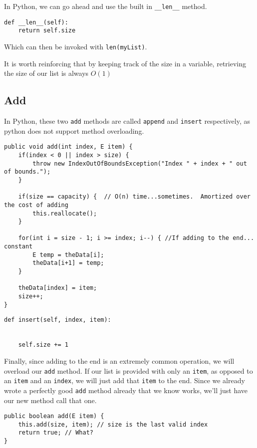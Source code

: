 In Python, we can go ahead and use the built in \texttt{\_\_len\_\_} method.

\begin{verbatim}
def __len__(self):
	return self.size
\end{verbatim}

Which can then be invoked with \texttt{len(myList)}.


It is worth reinforcing that by keeping track of the size in a variable, retrieving the size of our list is always $O(1)$

\subsection{Add}



In Python, these two \texttt{add} methods are called \texttt{append} and \texttt{insert} respectively, as python does not support method overloading.

\begin{verbatim}
public void add(int index, E item) {
	if(index < 0 || index > size) {
		throw new IndexOutOfBoundsException("Index " + index + " out of bounds.");
	}
	
	if(size == capacity) {  // O(n) time...sometimes.  Amortized over the cost of adding
		this.reallocate();
	}
	
	for(int i = size - 1; i >= index; i--) { //If adding to the end... constant
		E temp = theData[i];
		theData[i+1] = temp;
	}
	
	theData[index] = item;
	size++;
}
\end{verbatim}


\begin{verbatim}
def insert(self, index, item):
	
	
	self.size += 1

\end{verbatim}





Finally, since adding to the end is an extremely common operation, we will overload our \texttt{add} method.
If our list is provided with only an \texttt{item}, as opposed to an \texttt{item} and an \texttt{index}, we will just add that \texttt{item} to the end.
Since we already wrote a perfectly good \texttt{add} method already that we know works, we'll just have our new method call that one.
\begin{verbatim}
public boolean add(E item) {
	this.add(size, item); // size is the last valid index
	return true; // What?
}
\end{verbatim}

